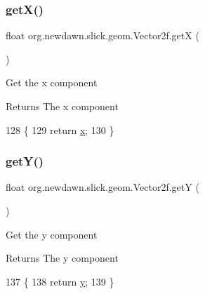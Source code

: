 \subsubsection{\texorpdfstring{get\+X()}{getX()}}
{\footnotesize\ttfamily float org.\+newdawn.\+slick.\+geom.\+Vector2f.\+getX (\begin{DoxyParamCaption}{ }\end{DoxyParamCaption})\hspace{0.3cm}{\ttfamily [inline]}}

Get the x component

\begin{DoxyReturn}{Returns}
The x component 
\end{DoxyReturn}

\begin{DoxyCode}
128                         \{
129         \textcolor{keywordflow}{return} \mbox{\hyperlink{classorg_1_1newdawn_1_1slick_1_1geom_1_1_vector2f_a3c72cdf13ebc511a472e1a02002fa579}{x}};
130     \}
\end{DoxyCode}
\mbox{\label{classorg_1_1newdawn_1_1slick_1_1geom_1_1_vector2f_aa26075f083c1ce0c8c87536bc008cc8c}} 
\subsubsection{\texorpdfstring{get\+Y()}{getY()}}
{\footnotesize\ttfamily float org.\+newdawn.\+slick.\+geom.\+Vector2f.\+getY (\begin{DoxyParamCaption}{ }\end{DoxyParamCaption})\hspace{0.3cm}{\ttfamily [inline]}}

Get the y component

\begin{DoxyReturn}{Returns}
The y component 
\end{DoxyReturn}

\begin{DoxyCode}
137                         \{
138         \textcolor{keywordflow}{return} \mbox{\hyperlink{classorg_1_1newdawn_1_1slick_1_1geom_1_1_vector2f_aa03914f0c3d32063aa90e5bd7b74688e}{y}};
139     \}
\end{DoxyCode}
\mbox{\label{classorg_1_1newdawn_1_1slick_1_1geom_1_1_vector2f_a554b68db2496c97b8d4d84c12c5aef4e}} 
